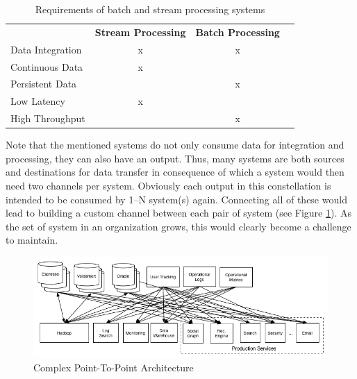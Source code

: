 \begin{table}[H]
\centering
\begin{tabular}{l|c|cl}
\multicolumn{1}{c|}{\textbf{}} & \textbf{Stream Processing} & \textbf{Batch
Processing} & \multicolumn{1}{c}{\textbf{}} \\ \cline{1-3}
Data Integration               & x                          & x
&                               \\
Continuous Data                & x                          &
&                               \\
Persistent Data                &                            & x
&                               \\
Low Latency                    & x                          &
&                               \\
High Throughput                     &                            & x
&
\end{tabular}
\caption{Requirements of batch and stream processing systems}
\label{table:requirements-batch-stream}
\end{table}

Note that the mentioned systems  do not only consume data for
integration and processing, they can also have an output. Thus, many systems are
both sources and destinations for data transfer in consequence of which a system
would then need two channels  per system. Obviously each output in
this constellation is intended to be consumed by 1--N system(s) again.
Connecting all of these would lead to building a custom channel between each
pair of system (see Figure \ref{fig:datapipeline_complex}). As the set of system
in an organization grows, this would clearly become a challenge to maintain.

\begin{figure}[H]
    \centering
    \includegraphics[width=1.0\textwidth]{images/datapipeline_complex.png}
    \caption{Complex Point-To-Point Architecture}
    \label{fig:datapipeline_complex}
\end{figure}

